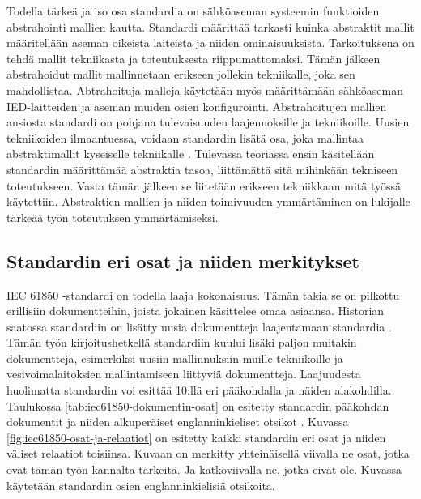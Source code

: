 Todella tärkeä ja iso osa standardia on sähköaseman systeemin funktioiden abstrahointi mallien kautta. Standardi määrittää tarkasti kuinka abstraktit mallit määritellään aseman oikeista laiteista ja niiden ominaisuuksista. Tarkoituksena on tehdä mallit tekniikasta ja toteutuksesta riippumattomaksi. Tämän jälkeen abstrahoidut mallit mallinnetaan erikseen jollekin tekniikalle, joka sen mahdollistaa. Abtrahoituja malleja käytetään myös määrittämään sähköaseman IED-laitteiden ja aseman muiden osien konfigurointi. Abstrahoitujen mallien ansiosta standardi on pohjana tulevaisuuden laajennoksille ja tekniikoille. Uusien tekniikoiden ilmaantuessa, voidaan standardin lisätä  osa, joka  mallintaa abstraktimallit kyseiselle tekniikalle \cite[s.~2]{Brunner2008}. Tulevassa teoriassa ensin käsitellään standardin määrittämää abstraktia tasoa, liittämättä sitä mihinkään tekniseen toteutukseen. Vasta tämän jälkeen se liitetään erikseen tekniikkaan mitä työssä käytettiin. Abstraktien mallien ja niiden toimivuuden ymmärtäminen on lukijalle tärkeää työn toteutuksen ymmärtämiseksi.


\subsection{Standardin eri osat ja niiden merkitykset}	
IEC 61850 -standardi on todella laaja kokonaisuus. Tämän takia se on pilkottu erillisiin dokumentteihin, joista jokainen käsittelee omaa asiaansa. Historian saatossa standardiin on lisätty uusia dokumentteja laajentamaan standardia \cite{IEC61850series, New-documents-by-IEC-TC-57} \cite[s.~13]{IEC61850-1}. Tämän työn kirjoitushetkellä standardiin kuului lisäki paljon muitakin dokumentteja, esimerkiksi uusiin mallinnuksiin muille tekniikoille ja vesivoimalaitoksien mallintamiseen liittyviä dokumentteja. Laajuudesta huolimatta standardin voi esittää 10:llä eri pääkohdalla ja näiden alakohdilla. Taulukossa \ref{tab:iec61850-dokumentin-osat} on esitetty standardin pääkohdan dokumentit ja niiden alkuperäiset englanninkieliset otsikot \cite[s.~2]{Mackiewicz2006} \cite{IEC61850series}. Kuvassa \ref{fig:iec61850-osat-ja-relaatiot} on esitetty kaikki standardin eri osat ja niiden väliset relaatiot toisiinsa. Kuvaan on merkitty yhteinäisellä viivalla ne osat, jotka ovat tämän työn kannalta tärkeitä. Ja katkoviivalla ne, jotka eivät ole. Kuvassa käytetään standardin osien englanninkielisiä otsikoita.

